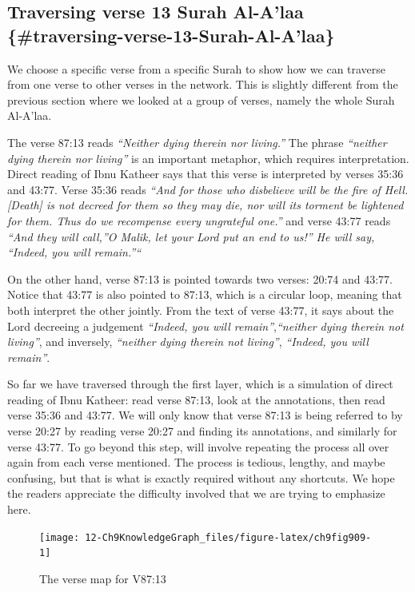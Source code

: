 \documentclass[
]{article}
\begin{document}
\hypertarget{traversing-verse-13-surah-al-alaa-traversing-verse-13-surah-al-alaa}{%
\subsection{Traversing verse 13 Surah Al-A'laa \{\#traversing-verse-13-Surah-Al-A'laa\}}\label{traversing-verse-13-surah-al-alaa-traversing-verse-13-surah-al-alaa}}

We choose a specific verse from a specific Surah to show how we can traverse from one verse to other verses in the network. This is slightly different from the previous section where we looked at a group of verses, namely the whole Surah Al-A'laa.

The verse 87:13 reads \emph{``Neither dying therein nor living.''} The phrase \emph{``neither dying therein nor living''} is an important metaphor, which requires interpretation. Direct reading of Ibnu Katheer says that this verse is interpreted by verses 35:36 and 43:77. Verse 35:36 reads \emph{``And for those who disbelieve will be the fire of Hell. {[}Death{]} is not decreed for them so they may die, nor will its torment be lightened for them. Thus do we recompense every ungrateful one.''} and verse 43:77 reads \emph{``And they will call,''O Malik, let your Lord put an end to us!'' He will say, ``Indeed, you will remain.''``}

On the other hand, verse 87:13 is pointed towards two verses: 20:74 and 43:77. Notice that 43:77 is also pointed to 87:13, which is a circular loop, meaning that both interpret the other jointly. From the text of verse 43:77, it says about the Lord decreeing a judgement \emph{``Indeed, you will remain''},\emph{``neither dying therein not living''}, and inversely, \emph{``neither dying therein not living''}, \emph{``Indeed, you will remain''}.

So far we have traversed through the first layer, which is a simulation of direct reading of Ibnu Katheer: read verse 87:13, look at the annotations, then read verse 35:36 and 43:77. We will only know that verse 87:13 is being referred to by verse 20:27 by reading verse 20:27 and finding its annotations, and similarly for verse 43:77. To go beyond this step, will involve repeating the process all over again from each verse mentioned. The process is tedious, lengthy, and maybe confusing, but that is what is exactly required without any shortcuts. We hope the readers appreciate the difficulty involved that we are trying to emphasize here.

\begin{figure}

{\centering \texttt{[image: 12-Ch9KnowledgeGraph\_files/figure-latex/ch9fig909-1]} 

}

\caption{The verse map for V87:13}\label{fig:ch9fig909}
\end{figure}
\end{document}
